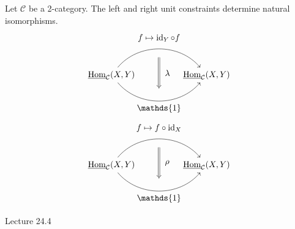 \begin{prop}
	Let $ \mathcal{ C } $ be a 2-category. 
	The left and right unit constraints determine natural isomorphisms.
	\[
	\begin{tikzcd}
		\twoHom_{ \mathcal{ C } } ( X , Y )
		\arrow[bend left=50]{rr}[name=U',label=above:$ f \mapsto \id_Y \circ f $]{}
		\arrow[bend right=50]{rr}[name=D',label=below:$ \mathds{ 1 } $]{}
		&&
		\twoHom_{ \mathcal{ C } } ( X , Y )
		\arrow[shorten <=10pt,shorten >=10pt,Rightarrow,to path={(U')-- node[label=right:$ \lambda $] {} (D')}]{}
	\end{tikzcd}
	\]
	\[
	\begin{tikzcd}
		\twoHom_{ \mathcal{ C } } ( X , Y )
		\arrow[bend left=50]{rr}[name=U',label=above:$ f \mapsto f \circ \id_X $]{}
		\arrow[bend right=50]{rr}[name=D',label=below:$ \mathds{ 1 } $]{}
		&&
		\twoHom_{ \mathcal{ C } } ( X , Y )
		\arrow[shorten <=10pt,shorten >=10pt,Rightarrow,to path={(U')-- node[label=right:$ \rho $] {} (D')}]{}
	\end{tikzcd}
	\]
\end{prop}

Lecture 24.4

